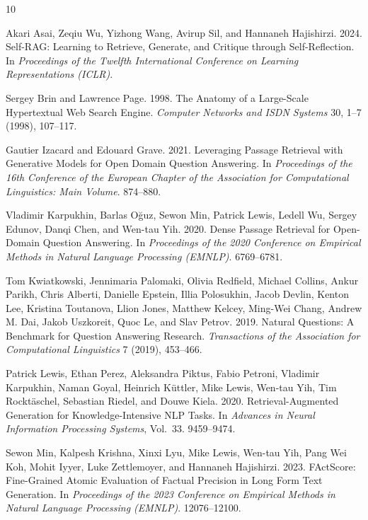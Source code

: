 \begin{thebibliography}{10}

Akari Asai, Zeqiu Wu, Yizhong Wang, Avirup Sil, and Hannaneh Hajishirzi. 2024.
Self-RAG: Learning to Retrieve, Generate, and Critique through Self-Reflection.
In \emph{Proceedings of the Twelfth International Conference on Learning
Representations (ICLR)}.

Sergey Brin and Lawrence Page. 1998.
The Anatomy of a Large-Scale Hypertextual Web Search Engine.
\emph{Computer Networks and ISDN Systems} 30, 1--7 (1998), 107--117.

Gautier Izacard and Edouard Grave. 2021.
Leveraging Passage Retrieval with Generative Models for Open Domain Question
Answering.
In \emph{Proceedings of the 16th Conference of the European Chapter of the
Association for Computational Linguistics: Main Volume}. 874--880.

Vladimir Karpukhin, Barlas O\u{g}uz, Sewon Min, Patrick Lewis, Ledell Wu,
Sergey Edunov, Danqi Chen, and Wen-tau Yih. 2020.
Dense Passage Retrieval for Open-Domain Question Answering.
In \emph{Proceedings of the 2020 Conference on Empirical Methods in Natural
Language Processing (EMNLP)}. 6769--6781.

Tom Kwiatkowski, Jennimaria Palomaki, Olivia Redfield, Michael Collins,
Ankur Parikh, Chris Alberti, Danielle Epstein, Illia Polosukhin, Jacob Devlin,
Kenton Lee, Kristina Toutanova, Llion Jones, Matthew Kelcey, Ming-Wei Chang,
Andrew M. Dai, Jakob Uszkoreit, Quoc Le, and Slav Petrov. 2019.
Natural Questions: A Benchmark for Question Answering Research.
\emph{Transactions of the Association for Computational Linguistics} 7 (2019),
453--466.

Patrick Lewis, Ethan Perez, Aleksandra Piktus, Fabio Petroni, Vladimir Karpukhin,
Naman Goyal, Heinrich K\"uttler, Mike Lewis, Wen-tau Yih, Tim Rockt\"aschel,
Sebastian Riedel, and Douwe Kiela. 2020.
Retrieval-Augmented Generation for Knowledge-Intensive NLP Tasks.
In \emph{Advances in Neural Information Processing Systems}, Vol.~33.
9459--9474.

Sewon Min, Kalpesh Krishna, Xinxi Lyu, Mike Lewis, Wen-tau Yih, Pang Wei Koh,
Mohit Iyyer, Luke Zettlemoyer, and Hannaneh Hajishirzi. 2023.
FActScore: Fine-Grained Atomic Evaluation of Factual Precision in Long Form Text
Generation.
In \emph{Proceedings of the 2023 Conference on Empirical Methods in Natural
Language Processing (EMNLP)}. 12076--12100.


\end{thebibliography}

